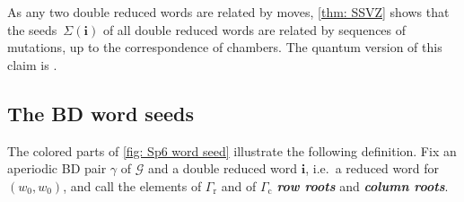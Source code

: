 \documentclass[a4paper]{amsart}
\numberwithin{equation}{section}
\theoremstyle{definition}
\theoremstyle{remark}
\newcommand{\mcG}{\mathcal{G}}
\newcommand{\bfi}{\mathbf{i}}
\newcommand{\rr}{\mathrm{r}}
\newcommand{\cc}{\mathrm{c}}
\newcommand{\newword}[1]{\textbf{\emph{#1}}}
\begin{document}
\begin{remark}
  As any two double reduced words are related by moves, \cref{thm: SSVZ} shows that the seeds~$\Sigma(\bfi)$ of all double reduced words are related by sequences of mutations, up to the correspondence of chambers.
  The quantum version of this claim is \cite[Theorem~A]{QY25}.
\end{remark}

\subsection{The BD word seeds}
\label{sec: BD word seeds}
The colored parts of \cref{fig: Sp6 word seed} illustrate the following definition.
Fix an aperiodic BD pair $\gamma$ of $\mcG$ and a double reduced word $\bfi$, i.e.\ a reduced word for $(w_0,w_0)$, and call the elements of $\Gamma_{\rr}$ and of $\Gamma_{\cc}$ \newword{row roots} and \newword{column roots}.
\end{document}
